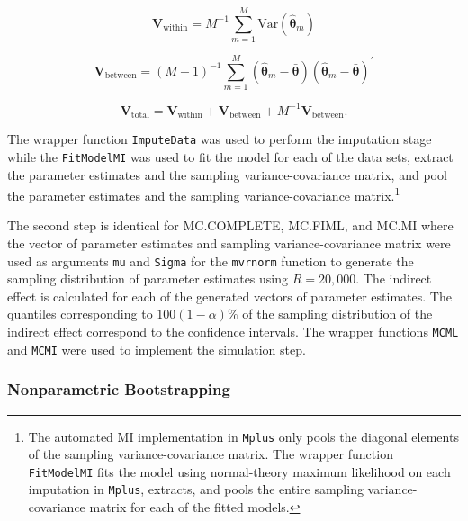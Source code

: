 \documentclass[man]{apa7}\usepackage[]{graphicx}\usepackage[]{xcolor}
\begin{document}
\begin{equation}
    \mathbf{V}_{\mathrm{within}}
    =
    M^{-1}
    \sum_{m = 1}^{M}
    \mathrm{Var}
    \left(
    \hat{\boldsymbol{\theta}}_{m}
    \right)
\end{equation}

\begin{equation}
    \mathbf{V}_{\mathrm{between}}
    =
    \left( 
    M - 1 
    \right)^{-1} 
    \sum_{m = 1}^{M} 
    \left( 
    \hat{\boldsymbol{\theta}}_{m}
    - 
    \bar{\boldsymbol{\theta}} 
    \right) 
    \left( 
    \hat{\boldsymbol{\theta}}_{m}
    - 
    \bar{\boldsymbol{\theta}} 
    \right)^{\prime}
\end{equation}

\begin{equation}
    \mathbf{V}_{\mathrm{total}} 
    = 
    \mathbf{V}_{\mathrm{within}} 
    + 
    \mathbf{V}_{\mathrm{between}} 
    + 
    M^{-1} 
    \mathbf{V}_{\mathrm{between}} .
    \label{eq:mi-var-total}
\end{equation}

\noindent The wrapper function \texttt{ImputeData} was used to perform the imputation stage while the \texttt{FitModelMI}
was used to fit the model for each of the data sets,
extract the parameter estimates and the sampling variance-covariance matrix,
and pool the parameter estimates and the sampling variance-covariance matrix.\footnote{The automated MI implementation in \texttt{Mplus} only pools the diagonal elements of the sampling variance-covariance matrix.
The wrapper function \texttt{FitModelMI} fits the model using normal-theory maximum likelihood on each imputation in \texttt{Mplus},
extracts, and pools the entire sampling variance-covariance matrix for each of the fitted models.}

The second step is identical for MC.COMPLETE,
MC.FIML,
and MC.MI
where the vector of parameter estimates and sampling variance-covariance matrix
were used as arguments \texttt{mu} and \texttt{Sigma} for the \texttt{mvrnorm} function
to generate the sampling distribution of parameter estimates using $R = 20,000$.
The indirect effect is calculated for each of the generated vectors of parameter estimates. 
The quantiles corresponding to $100 \left(1 - \alpha \right) \%$ of the sampling distribution of the indirect effect correspond to the confidence intervals.
The wrapper functions \texttt{MCML} and \texttt{MCMI} were used to implement the simulation step.

\subsubsection{Nonparametric Bootstrapping}
\end{document}
